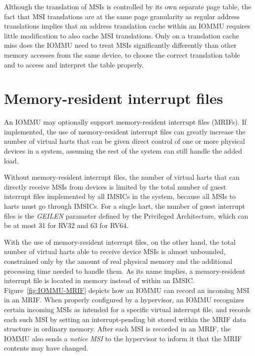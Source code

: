 \begin{commentary}
Although the translation of MSIs is controlled by its own separate page
table, the fact that MSI translations are at the same page granularity
as regular {\RISCV} address translations implies that an address
translation cache within an \mbox{IOMMU} requires little modification to
also cache MSI translations.
Only on a translation cache miss does the \mbox{IOMMU} need to treat MSIs
significantly differently than other memory accesses from the same
device, to choose the correct translation table and to access and
interpret the table properly.
\end{commentary}

\section{Memory-resident interrupt files}
\label{sec:IOMMU-MRIFs}

An \mbox{IOMMU} may optionally support memory-resident interrupt files
(MRIFs).
If implemented, the use of memory-resident interrupt files can greatly
increase the number of virtual harts that can be given direct control
of one or more physical devices in a system, assuming the rest of the
system can still handle the added load.

Without memory-resident interrupt files, the number of virtual {\RISCV}
harts that can directly receive MSIs from devices is limited by the
total number of guest interrupt files implemented by all IMSICs in the
system, because all MSIs to {\RISCV} harts must go through IMSICs.
For a single {\RISCV} hart, the number of guest interrupt files is the
\emph{GEILEN} parameter defined by the Privileged Architecture, which
can be at most 31 for RV32 and 63 for RV64.

With the use of memory-resident interrupt files, on the other hand,
the total number of virtual {\RISCV} harts able to receive device MSIs
is almost unbounded, constrained only by the amount of real physical
memory and the additional processing time needed to handle them.
As its name implies, a memory-resident interrupt file is located in
memory instead of within an IMSIC.
Figure~\ref{fig:IOMMU-MRIF} depicts how an \mbox{IOMMU} can record an
incoming MSI in an MRIF.
When properly configured by a hypervisor, an \mbox{IOMMU} recognizes certain
incoming MSIs as intended for a specific virtual interrupt file, and
records each such MSI by setting an interrupt-pending bit stored within
the MRIF data structure in ordinary memory.
After each MSI is recorded in an MRIF, the \mbox{IOMMU} also sends a
\emph{notice MSI} to the hypervisor to inform it that the MRIF contents
may have changed.

